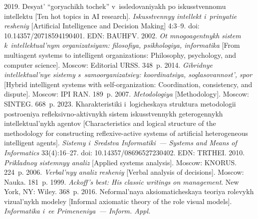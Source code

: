 \begin{multicols}{2}
{\small\frenchspacing
 {\baselineskip=11.5pt
 \begin{thebibliography}{99} 
    2019. Desyat' ``goryachikh tochek'' v~issledovaniyakh po 
iskusstvennomu intellektu [Ten hot topics in AI research]. \textit{Is\-kus\-stven\-nyy in\-tel\-lekt 
i~pri\-nya\-tie re\-she\-niy} [Artificial Intelligence and Decision Making] 4:3--9. doi: 
10.14357/20718594190401. EDN: BAUHFV.
    2002. \textit{Ot mnogoagentnykh sis\-tem k~in\-tel\-lek\-tu\-al'\-nym 
or\-ga\-ni\-za\-tsi\-yam: fi\-lo\-so\-fiya, psi\-kho\-lo\-giya, in\-for\-ma\-ti\-ka} [From multiagent systems to intelligent 
organizations: Philosophy, psychology, and computer science]. Moscow: Editorial URSS. 348~p.
    2014. \textit{Gib\-rid\-nye 
in\-tel\-lek\-tu\-al'\-nye sis\-te\-my s~sa\-mo\-or\-ga\-ni\-za\-tsiey: ko\-or\-di\-na\-tsiya, so\-gla\-so\-van\-nost', spor} [Hybrid 
intelligent systems with self-organization: Coordination, consistency, and dispute]. Moscow: IPI 
RAN. 189~p.
    2007. \textit{Me\-to\-do\-lo\-giya} [Methodology]. 
Moscow: SINTEG. 668~p.
    2023. Kharakteristiki i~logicheskaya struk\-tu\-ra me\-to\-do\-lo\-gii po\-stro\-eniya 
refleksivno-aktivnykh sis\-tem is\-kus\-stven\-nykh ge\-te\-ro\-gen\-nykh in\-tel\-lek\-tu\-al'\-nykh agen\-tov 
[Characteristics and logical structure of the methodology for constructing reflexive-active systems 
of artificial heterogeneous intelligent agents]. \textit{Sistemy i~Sredstva Informatiki~--- Systems 
and Means of Informatics} 33(4):16--27. doi: 10.14357/08696527230402. EDN: TRTHEI.
    2010. \textit{Pri\-klad\-noy sis\-tem\-nyy ana\-liz} 
[Applied systems analysis]. Moscow: KNORUS. 224~p.
    2006. \textit{Ver\-bal'\-nyy ana\-liz re\-she\-niy} [Verbal analysis of decisions]. 
Moscow: Nauka. 181~p.
    1999. \textit{Ackoff's best: His classic writings on management}. New 
York, NY: Wiley. 368~p.
2016. Ne\-for\-mal'\-naya ak\-sio\-ma\-ti\-che\-skaya teo\-riya ro\-le\-vykh vi\-zu\-al'\-nykh mo\-de\-ley [Informal axiomatic 
theory of the role visual models]. \textit{Informatika i~ee Primeneniya~--- Inform. Appl.} 

\end{thebibliography}}}
\end{multicols}

